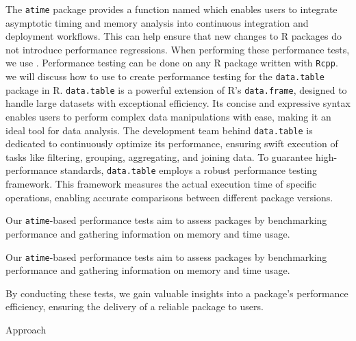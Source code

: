 The \texttt{atime} package provides a function named  which enables users to integrate asymptotic timing and memory analysis into continuous integration and deployment workflows. 
This can help ensure that new changes to R packages do not introduce performance regressions. When performing these performance tests, we use .
Performance testing can be done on any R package written with \texttt{Rcpp}.\\



\noindent we will discuss how to use  to create performance testing for the \texttt{data.table} package in R.
\texttt{data.table} is a powerful extension of R's \texttt{data.frame}, designed to handle large datasets with exceptional efficiency. Its concise and expressive syntax enables users to perform complex data manipulations with ease, making it an ideal tool for data analysis. The development team behind \texttt{data.table} is dedicated to continuously optimize its performance, ensuring swift execution of tasks like filtering, grouping, aggregating, and joining data.
\vspace{0.1in}
To guarantee high-performance standards, \texttt{data.table} employs a robust performance testing framework. This framework measures the actual execution time of specific operations, enabling accurate comparisons between different package versions. 

Our \texttt{atime}-based performance tests aim to assess packages by benchmarking performance and gathering information on memory and time usage. 

Our \texttt{atime}-based performance tests aim to assess packages by benchmarking performance and gathering information on memory and time usage.


\vspace{0.1in}
By conducting these tests, we gain valuable insights into a package's performance efficiency, ensuring the delivery of a reliable package to users.
\vspace{0.1in}

\noindent Approach

